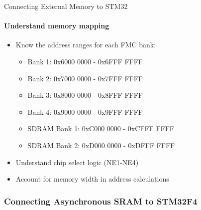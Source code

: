 \begin{KR}{Connecting External Memory to STM32}
\paragraph{Understand memory mapping}
\begin{itemize}
    \item Know the address ranges for each FMC bank:
    \begin{itemize}
        \item Bank 1: 0x6000 0000 - 0x6FFF FFFF
        \item Bank 2: 0x7000 0000 - 0x7FFF FFFF
        \item Bank 3: 0x8000 0000 - 0x8FFF FFFF
        \item Bank 4: 0x9000 0000 - 0x9FFF FFFF
        \item SDRAM Bank 1: 0xC000 0000 - 0xCFFF FFFF
        \item SDRAM Bank 2: 0xD000 0000 - 0xDFFF FFFF
    \end{itemize}
    \item Understand chip select logic (NE1-NE4)
    \item Account for memory width in address calculations
\end{itemize}
\end{KR}



\subsubsection{Connecting Asynchronous SRAM to STM32F4}

